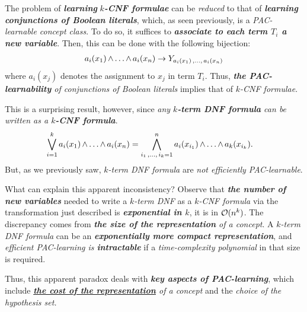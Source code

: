 \documentclass[11pt]{article}
\begin{document}
\begin{itemize}
\begin{example}
The problem of \emph{\textbf{learning}} \emph{\textbf{$k$-CNF formulae}} can be \emph{reduced} to that of \emph{\textbf{learning}} \emph{\textbf{conjunctions of Boolean literals}}, which, as seen previously, is a \emph{PAC-learnable concept class}.  To do so, it suffices to \emph{\textbf{associate to each term $T_i$ a new variable}}.
Then, this can be done with the following bijection:
\begin{align*}
a_i(x_1) \,{\land}\ldots{\land}\, a_i(x_n) \rightarrow Y_{a_i(x_1) \,{,}\ldots{,}\, a_i(x_n)}
\end{align*} where $a_i(x_j)$ denotes the assignment to $x_j$ in term $T_i$. Thus, \emph{\textbf{the PAC-learnability} of conjunctions of Boolean literals} implies
that of \emph{$k$-CNF formulae}.

This is a surprising result, however, since \emph{any \textbf{$k$-term DNF formula} can be written as a \textbf{$k$-CNF formula}}. 
\begin{align*}
\bigvee_{i=1}^k a_i(x_1) \,{\land}\ldots{\land}\, a_i(x_n) &= \bigwedge_{i_1 \,{,}\ldots{,}\, i_k = 1}^{n}a_i(x_{i_1}) \,{\land}\ldots{\land}\, a_k(x_{i_k}). 
\end{align*} But, as we previously saw, \emph{$k$-term DNF formula} are \emph{not efficiently PAC-learnable}. 

What can explain this apparent inconsistency? Observe that \emph{\textbf{the number of new variables}} needed to write a \emph{$k$-term DNF} as a \emph{$k$-CNF  formula} via the transformation just described is \emph{\textbf{exponential in $k$}}, it is in ${\mathcal O}(n^k)$. The discrepancy comes from \emph{\textbf{the size
of the representation} of a concept}.  A \emph{$k$-term DNF formula} can be an \emph{\textbf{exponentially more compact representation}}, and \emph{efficient PAC-learning is \textbf{intractable}} if a \emph{time-complexity polynomial} in that size is required.

Thus, this apparent paradox deals with \emph{\textbf{key aspects of PAC-learning}}, which include \emph{\textbf{\underline{the cost of the representation}} of a concept} and the \emph{choice of the hypothesis set.}
\end{example}
\end{itemize}
\end{document}
